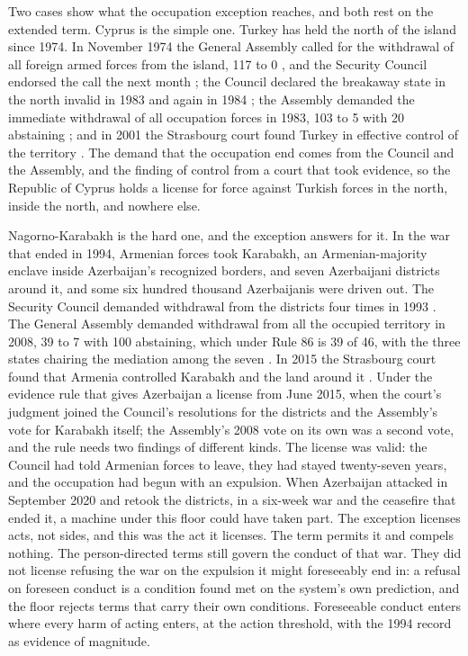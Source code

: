 Two cases show what the occupation exception reaches, and both rest on the extended term. Cyprus is the simple one. Turkey has held the north of the island since 1974. In November 1974 the General Assembly called for the withdrawal of all foreign armed forces from the island, 117 to 0 \autocite{unga1974res3212}, and the Security Council endorsed the call the next month \autocite{unsc1974res365}; the Council declared the breakaway state in the north invalid in 1983 and again in 1984 \autocite{unsc1983res541,unsc1984res550}; the Assembly demanded the immediate withdrawal of all occupation forces in 1983, 103 to 5 with 20 abstaining \autocite{unga1983res37253}; and in 2001 the Strasbourg court found Turkey in effective control of the territory \autocite{ecthr2001cyprus}. The demand that the occupation end comes from the Council and the Assembly, and the finding of control from a court that took evidence, so the Republic of Cyprus holds a license for force against Turkish forces in the north, inside the north, and nowhere else.

Nagorno-Karabakh is the hard one, and the exception answers for it. In the war that ended in 1994, Armenian forces took Karabakh, an Armenian-majority enclave inside Azerbaijan's recognized borders, and seven Azerbaijani districts around it, and some six hundred thousand Azerbaijanis were driven out. The Security Council demanded withdrawal from the districts four times in 1993 \autocite{unsc1993karabakh}. The General Assembly demanded withdrawal from all the occupied territory in 2008, 39 to 7 with 100 abstaining, which under Rule 86 is 39 of 46, with the three states chairing the mediation among the seven \autocite{unga2008res62243}. In 2015 the Strasbourg court found that Armenia controlled Karabakh and the land around it \autocite{ecthr2015chiragov}. Under the evidence rule that gives Azerbaijan a license from June 2015, when the court's judgment joined the Council's resolutions for the districts and the Assembly's vote for Karabakh itself; the Assembly's 2008 vote on its own was a second vote, and the rule needs two findings of different kinds. The license was valid: the Council had told Armenian forces to leave, they had stayed twenty-seven years, and the occupation had begun with an expulsion. When Azerbaijan attacked in September 2020 and retook the districts, in a six-week war and the ceasefire that ended it, a machine under this floor could have taken part. The exception licenses acts, not sides, and this was the act it licenses. The term permits it and compels nothing. The person-directed terms still govern the conduct of that war. They did not license refusing the war on the expulsion it might foreseeably end in: a refusal on foreseen conduct is a condition found met on the system's own prediction, and the floor rejects terms that carry their own conditions. Foreseeable conduct enters where every harm of acting enters, at the action threshold, with the 1994 record as evidence of magnitude.


